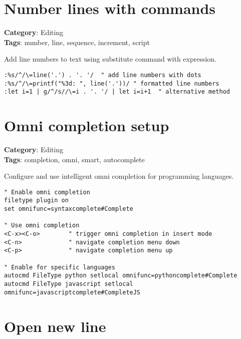 {{{{\section{Number lines with commands}

\textbf{Category}: Editing\\ \textbf{Tags}: number, line, sequence, increment, script
\vspace{0.5cm}

Add line numbers to text using substitute command with expression.

\begin{Exa*}{}
\begin{Verbatim}[fontsize=\footnotesize, breaklines, breakanywhere]
:%s/^/\=line('.') . '. '/  " add line numbers with dots
:%s/^/\=printf("%3d: ", line('.'))/ " formatted line numbers
:let i=1 | g/^/s//\=i . '. '/ | let i=i+1  " alternative method
\end{Verbatim}
\end{Exa*}

\section{Omni completion setup}

\textbf{Category}: Editing\\ \textbf{Tags}: completion, omni, smart, autocomplete
\vspace{0.5cm}

Configure and use intelligent omni completion for programming languages.

\begin{Exa*}{}
\begin{Verbatim}[fontsize=\footnotesize, breaklines, breakanywhere]
" Enable omni completion
filetype plugin on
set omnifunc=syntaxcomplete#Complete

" Use omni completion
<C-x><C-o>        " trigger omni completion in insert mode
<C-n>             " navigate completion menu down
<C-p>             " navigate completion menu up

" Enable for specific languages
autocmd FileType python setlocal omnifunc=pythoncomplete#Complete
autocmd FileType javascript setlocal omnifunc=javascriptcomplete#CompleteJS
\end{Verbatim}
\end{Exa*}

\section{Open new line}

}}}}
